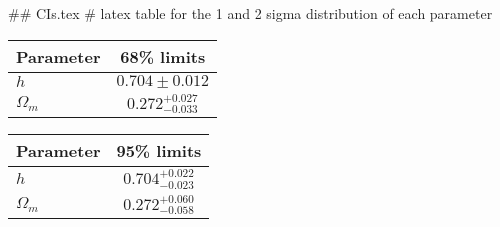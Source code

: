 ## CIs.tex
# latex table for the 1 and 2 sigma distribution of each parameter

\begin{tabular} { l  c}
 Parameter &  68\% limits\\
\hline
{\boldmath$h              $} & $0.704\pm 0.012            $\\
{\boldmath$\Omega_m       $} & $0.272^{+0.027}_{-0.033}   $\\
\hline
\end{tabular}

\begin{tabular} { l  c}
 Parameter &  95\% limits\\
\hline
{\boldmath$h              $} & $0.704^{+0.022}_{-0.023}   $\\
{\boldmath$\Omega_m       $} & $0.272^{+0.060}_{-0.058}   $\\
\hline
\end{tabular}
